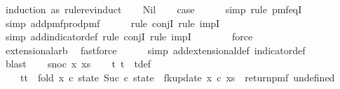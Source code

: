\begin{isabellebody}
%
\isadelimproof
%
\endisadelimproof
%
\isatagproof
{}\isamarkupfalse%
\ {\isacharparenleft}{\kern0pt}induction\ as\ rule{\isacharcolon}{\kern0pt}rev{\isacharunderscore}{\kern0pt}induct{\isacharparenright}{\kern0pt}\isanewline
\ \ \isamarkupfalse%
\ Nil\isanewline
\ \ \isamarkupfalse%
\ {\isacharquery}{\kern0pt}case\isanewline
\ \ \ \ \isamarkupfalse%
\ {\isacharparenleft}{\kern0pt}simp{\isacharcomma}{\kern0pt}\ rule\ pmf{\isacharunderscore}{\kern0pt}eqI{\isacharparenright}{\kern0pt}\isanewline
\ \ \ \ \isamarkupfalse%
\ {\isacharparenleft}{\kern0pt}simp\ add{\isacharcolon}{\kern0pt}pmf{\isacharunderscore}{\kern0pt}prod{\isacharunderscore}{\kern0pt}pmf{\isacharparenright}{\kern0pt}\isanewline
\ \ \ \ \isamarkupfalse%
\ {\isacharparenleft}{\kern0pt}rule\ conjI{\isacharcomma}{\kern0pt}\ rule\ impI{\isacharparenright}{\kern0pt}\isanewline
\ \ \ \ \ \isamarkupfalse%
\ {\isacharparenleft}{\kern0pt}simp\ add{\isacharcolon}{\kern0pt}indicator{\isacharunderscore}{\kern0pt}def{\isacharcomma}{\kern0pt}\ rule\ conjI{\isacharcomma}{\kern0pt}\ rule\ impI{\isacharparenright}{\kern0pt}\isanewline
\ \ \ \ \ \ \isamarkupfalse%
\ force\isanewline
\ \ \ \ \ \isamarkupfalse%
\ extensional{\isacharunderscore}{\kern0pt}arb\ \isamarkupfalse%
\ fastforce\isanewline
\ \ \ \ \isamarkupfalse%
\ {\isacharparenleft}{\kern0pt}simp\ add{\isacharcolon}{\kern0pt}extensional{\isacharunderscore}{\kern0pt}def\ indicator{\isacharunderscore}{\kern0pt}def{\isacharparenright}{\kern0pt}\isanewline
\ \ \ \ \isamarkupfalse%
\ blast\isanewline
{}\isamarkupfalse%
\isanewline
\ \ \isamarkupfalse%
\ {\isacharparenleft}{\kern0pt}snoc\ x\ xs{\isacharparenright}{\kern0pt}\isanewline
\ \ \isamarkupfalse%
\ t{}\ t{}\ \ t{\isacharunderscore}{\kern0pt}def{\isacharcolon}{\kern0pt}\ \isanewline
\ \ \ \ {\isachardoublequoteopen}{\isacharparenleft}{\kern0pt}t{}{\isacharcomma}{\kern0pt}t{}{\isacharparenright}{\kern0pt}\ {\isacharequal}{\kern0pt}\ fold\ {\isacharparenleft}{\kern0pt}{\isasymlambda}x\ {\isacharparenleft}{\kern0pt}c{\isacharcomma}{\kern0pt}\ state{\isacharparenright}{\kern0pt}{\isachardot}{\kern0pt}\ {\isacharparenleft}{\kern0pt}Suc\ c{\isacharcomma}{\kern0pt}\ state\ {\isasymbind}\ fk{\isacharunderscore}{\kern0pt}update{\isacharprime}{\kern0pt}{\isacharprime}{\kern0pt}\ x\ c{\isacharparenright}{\kern0pt}{\isacharparenright}{\kern0pt}\ xs\ {\isacharparenleft}{\kern0pt}{}{\isacharcomma}{\kern0pt}\ return{\isacharunderscore}{\kern0pt}pmf\ undefined{\isacharparenright}{\kern0pt}{\isachardoublequoteclose}\isanewline

\end{isabellebody}
